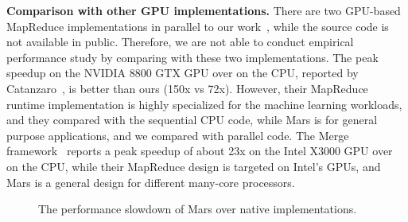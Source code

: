 {\bf Comparison with other GPU implementations.}
There are two GPU-based MapReduce implementations in parallel to our work~\cite{Catanzaro2008,Linderman2008}, while the source code is not available in public. 
Therefore, we are not able to conduct empirical performance study by comparing with these two implementations. 
The peak speedup on the NVIDIA 8800 GTX GPU over on the CPU, reported by Catanzaro~\cite{Catanzaro2008}, is better than ours (150x vs 72x). However, their MapReduce runtime implementation is highly specialized for the machine learning workloads, and they compared with the sequential CPU code, while Mars is for general purpose applications, and we compared with parallel code. 
The Merge framework~\cite{Linderman2008} reports a peak speedup of about 23x on the Intel X3000 GPU over on the CPU, while their MapReduce design is targeted on Intel's GPUs, and Mars is a general design for different many-core processors. 

\begin{figure}[ht]
\centerline{  \hfill {}
} 
\centerline{ 
}\caption{The performance slowdown of Mars over native implementations.}

\label{fig:slowdown}
\end{figure}

